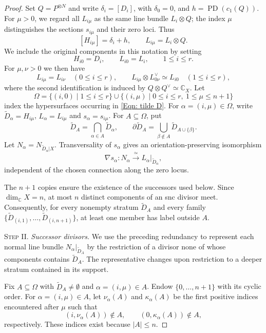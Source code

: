 \documentclass[11pt]{amsart}
\numberwithin{equation}{section}
\theoremstyle{plain}
\theoremstyle{definition}
\newcommand{\CC}{\mathbb{C}}
\begin{document}
\begin{proof}
Set $Q=P^{\otimes N}$ and write $\delta_i=[D_i]$, with $\delta_0=0$, and
$h=\operatorname{PD}(c_1(Q))$. For $\mu>0$, we regard all $L_{i\mu}$ as the
same line bundle $L_i\otimes Q$; the index $\mu$ distinguishes the sections
$s_{i\mu}$ and their zero loci. Thus
\[
[H_{i\mu}]=\delta_i+h,\qquad
L_{i\mu}=L_i\otimes Q.
\]
We include the original components in this notation by setting
\[
H_{i0}=D_i,\qquad L_{i0}=L_i,\qquad 1\le i\le r.
\]
For $\mu,\nu>0$ we then have
\begin{equation}
\label{Eqn: isos of line bundles}
L_{i\mu}=L_{i\nu}\quad(0\le i\le r),
\qquad
L_{i\mu}\otimes L_{0\nu}^{\vee}\simeq L_{i0}
\quad(1\le i\le r),
\end{equation}
where the second identification is induced by
$Q\otimes Q^\vee\simeq\CC_X$.
Let
\[
\Omega=
\{(i,0)\mid 1\le i\le r\}
\cup
\{(i,\mu)\mid 0\le i\le r,\ 1\le\mu\le n+1\}
\]
index the hypersurfaces occurring in \eqref{Eqn: tilde D}. For
$\alpha=(i,\mu)\in\Omega$, write $\widetilde D_\alpha=H_{i\mu}$,
$L_\alpha=L_{i\mu}$ and $s_\alpha=s_{i\mu}$. For $A\subseteq\Omega$, put
\[
\widetilde D_A=\bigcap_{\alpha\in A}\widetilde D_\alpha,
\qquad
\partial\widetilde D_A
=
\bigcup_{\beta\notin A}\widetilde D_{A\cup\{\beta\}}.
\]
Let $N_\alpha=N_{\widetilde D_\alpha|X}$. Transversality of $s_\alpha$
gives an orientation-preserving isomorphism
\begin{equation}
\label{Eqn: N_alpha versus L_alpha}
\nabla s_\alpha:
N_\alpha\xrightarrow{\;\simeq\;}
L_\alpha|_{\widetilde D_\alpha},
\end{equation}
independent of the chosen connection along the zero locus.

The $n+1$ copies ensure the existence of the successors used below. Since
$\dim_\CC X=n$, at most $n$ distinct components of an snc divisor meet.
Consequently, for every nonempty stratum $\widetilde D_A$ and every family
$\{\widetilde D_{(i,1)},\ldots,\widetilde D_{(i,n+1)}\}$, at least one member
has label outside $A$.

\medskip \noindent\textsc{Step II}. \emph{Successor divisors.} We use the
preceding redundancy to represent each normal line bundle $N_\alpha|_{\widetilde
D_A}$ by the restriction of a divisor none of whose components contains
$\widetilde D_A$. The representative changes upon restriction to a deeper
stratum contained in its support.

Fix $A\subseteq\Omega$ with $\widetilde D_A\ne\emptyset$ and
$\alpha=(i,\mu)\in A$. Endow $\{0,\ldots,n+1\}$ with its cyclic order. For
$\alpha=(i,\mu)\in A$, let $\nu_\alpha(A)$ and $\kappa_\alpha(A)$ be the first
positive indices encountered after $\mu$ such that
\[
(i,\nu_\alpha(A))\notin A,
\qquad
(0,\kappa_\alpha(A))\notin A,
\]
respectively. These indices exist because $|A|\le n$.


\end{proof}
\end{document}
